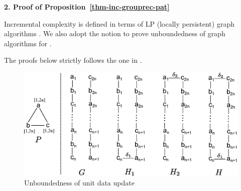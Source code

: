 \noindent
{\textbf{2. Proof of Proposition~\ref{thm-inc-grouprec-pat}}}

Incremental complexity is defined in terms of LP (locally persistent) graph algorithms \cite{Reps96}.
We also adopt the notion to prove unboundedness of graph algorithms for \dynteamF.

\vspace{-1.5ex}
The proofs below strictly follows the one in \cite{Reps96}.

\vspace{-1.5ex}
\begin{figure}[h!]
\label{fig-inc-complexity-data}
\begin{center}
\includegraphics[scale=0.31]{./fig/inc-complexity-proof-data.eps}
\end{center}
\vspace{-3ex}
\caption{Unboundedness of unit data update}
\vspace{-2ex}
\end{figure}

